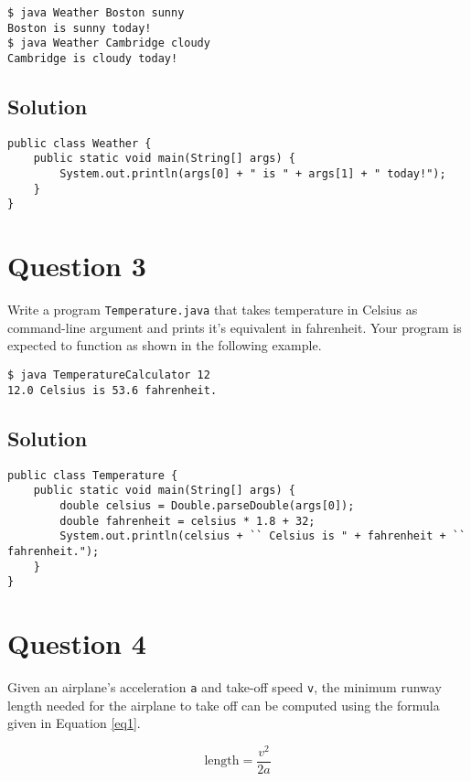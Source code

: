 \begin{verbatim}
$ java Weather Boston sunny
Boston is sunny today!
$ java Weather Cambridge cloudy
Cambridge is cloudy today!
\end{verbatim}

\subsection*{Solution}
\lstset{language=Java,tabsize=2}
\begin{lstlisting}
public class Weather {
	public static void main(String[] args) {
		System.out.println(args[0] + " is " + args[1] + " today!");
	}
}
\end{lstlisting}

\section*{Question 3}
Write a program \texttt{Temperature.java} that takes temperature in Celsius as command-line argument and prints it's equivalent in fahrenheit. Your program is expected to function as shown in the following example.

\begin{verbatim}
$ java TemperatureCalculator 12
12.0 Celsius is 53.6 fahrenheit.
\end{verbatim}

\subsection*{Solution}
\lstset{language=Java,tabsize=2}
\begin{lstlisting}
public class Temperature {
	public static void main(String[] args) {
		double celsius = Double.parseDouble(args[0]);
		double fahrenheit = celsius * 1.8 + 32;
		System.out.println(celsius + `` Celsius is " + fahrenheit + `` fahrenheit.");
	}
}
\end{lstlisting}

\section*{Question 4}
Given an airplane's acceleration \texttt{a} and take-off speed \texttt{v}, the minimum runway length needed for the airplane to take off can be computed using the formula given in Equation \ref{eq1}.

\begin{equation}
\textrm{length} = \frac{v^2}{2a}
\label{eq1}
\end{equation}

